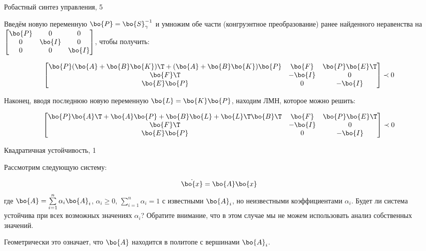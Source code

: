 \documentclass{beamer}
\begin{document}
\begin{frame}{Робастный синтез управления, 5}
	\begin{flushleft}
		
		Введём новую переменную $\bo{P} = \bo{S}^{-1}_\gamma$ и умножим обе части (конгруэнтное преобразование) ранее найденного неравенства на $\begin{bmatrix}
			\bo{P} & 0 & 0 \\
			0 & \bo{I} & 0 \\
			0 & 0 & \bo{I}
		\end{bmatrix}$, чтобы получить:
		
		\begin{equation}
			\begin{bmatrix}
				\bo{P}(\bo{A} + \bo{B}\bo{K})\T + (\bo{A} + \bo{B}\bo{K})\bo{P} & \bo{F} & \bo{P}\bo{E}\T \\
				\bo{F}\T & -\bo{I} & 0 \\
				\bo{E}\bo{P} & 0 & -\bo{I}
			\end{bmatrix} 
			\prec 0
		\end{equation}	
		
		Наконец, вводя последнюю новую переменную $\bo{L} = \bo{K}\bo{P}$, находим ЛМН, которое можно решить:
		
		\begin{equation}
			\begin{bmatrix}
				\bo{P}\bo{A}\T + \bo{A}\bo{P} + \bo{B}\bo{L} + \bo{L}\T \bo{B}\T & \bo{F} & \bo{P}\bo{E}\T \\
				\bo{F}\T & -\bo{I} & 0 \\
				\bo{E}\bo{P} & 0 & -\bo{I}
			\end{bmatrix} 
			\prec 0
		\end{equation}
		
		
	\end{flushleft}
\end{frame}

\begin{frame}{Квадратичная устойчивость, 1}
	\begin{flushleft}
		
		Рассмотрим следующую систему:
		
		\begin{equation}
			\dot{\bo{x}}  = \bo{A}\bo{x}
		\end{equation}
		где $\bo{A} = \sum\limits_{i=1}^{n} \alpha_i \bo{A}_i$, $\alpha_i \geq 0$, $\sum\limits_{i=1}^{n} \alpha_i = 1$ с известными $\bo{A}_i$, но неизвестными коэффициентами $\alpha_i$. Будет ли система устойчива при всех возможных значениях $\alpha_i$? Обратите внимание, что в этом случае мы не можем использовать анализ собственных значений.
		
		\bigskip
		
		Геометрически это означает, что $\bo{A}$ находится в политопе с вершинами $\bo{A}_i$.
		
	\end{flushleft}
\end{frame}
\end{document}
